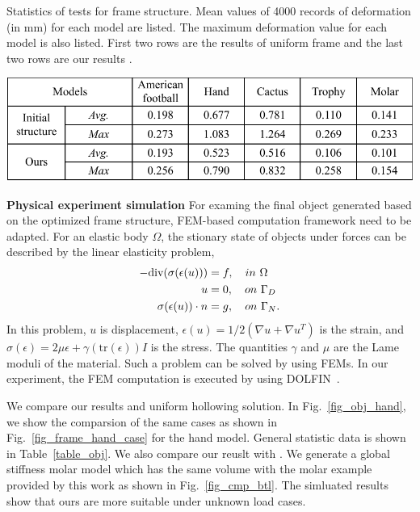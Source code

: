 \begin{table}[htb]
\caption{\label{table_frame}Statistics of tests for frame structure. Mean values of 4000 records of deformation (in mm) for each model are listed. The maximum deformation value for each model is also listed. First two rows are the results of uniform frame and the last two rows are our results .}
\centering
\includegraphics[width=0.5\linewidth]{Tables/table1}
\end{table}

\noindent\textbf{Physical experiment simulation} For examing the final object generated based on the optimized frame structure, FEM-based computation framework need to be adapted. For an elastic body $\Omega$, the stionary state of objects under forces can be described by the linear elasticity problem,
\begin{align}\label{eq:linear-elasticity}
     -\mbox{div}(\sigma(\epsilon(u))) & = f, \quad in\ \Omega \notag \\
                             u & = 0, \quad on\ \Gamma_D \\
          \sigma(\epsilon(u))\cdot n & = g, \quad on\ \Gamma_N. \notag
\end{align}
In this problem, $u$ is displacement, $\epsilon(u)=1/2(\nabla u+\nabla u^T)$ is the strain,
and $\sigma(\epsilon)=2\mu\epsilon+\gamma(\mathrm{tr}(\epsilon))I$ is the stress.
The quantities $\gamma$ and $\mu$ are the Lame moduli of the material. Such a problem can be solved by using FEMs. In our experiment, the FEM computation is executed by using DOLFIN~\cite{DOLFIN}.

We compare our results and uniform hollowing solution. In Fig.~\ref{fig_obj_hand}, we show the comparsion of the same cases as shown in Fig.~\ref{fig_frame_hand_case} for the hand model. General statistic data is shown in Table~\ref{table_obj}. We also compare our reuslt with \cite{Lu:2014}. We generate a global stiffness molar model which has the same volume with the molar example provided by this work as shown in Fig.~\ref{fig_cmp_btl}. 
The simluated results show that ours are more suitable under unknown load cases. 

